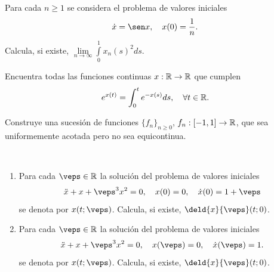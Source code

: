 \documentclass[12pt]{article}
\begin{document}
    \begin{ejercicio}
        Para cada $n \geq 1$ se considera el problema de valores iniciales
        \[
        \dot{x} = \sen x, \quad x(0) = \frac{1}{n}.
        \]
        Calcula, si existe, $\lim\limits_{n \to \infty} \int\limits_0^1 x_n(s)^2 ds$.
    \end{ejercicio}

    \begin{ejercicio}
        Encuentra todas las funciones continuas $x : \mathbb{R} \to \mathbb{R}$ que cumplen
        \[
        e^{x(t)} = \int_0^t e^{-x(s)} ds, \quad \forall t \in \mathbb{R}.
        \]
    \end{ejercicio}

    \begin{ejercicio}
        Construye una sucesión de funciones $\{f_n\}_{n \geq 0}$, $f_n : \left[-1, 1\right] \to \mathbb{R}$, que sea uniformemente acotada pero no sea equicontinua.
    \end{ejercicio}

    \begin{ejercicio}~
        \begin{enumerate}[label=\alph*)]
            \item Para cada $\veps \in \bb{R}$ la solución del problema de valores iniciales
            \[
            \ddot{x} + x + \veps^3 x^2 = 0, \quad x(0) = 0, \quad \dot{x}(0) = 1 + \veps
            \]
            se denota por $x(t; \veps)$. Calcula, si existe, $\deld{x}{\veps}(t; 0)$.
            \item Para cada $\veps \in \bb{R}$ la solución del problema de valores iniciales
            \[
            \ddot{x} + x + \veps^3 x^2 = 0, \quad x(\veps) = 0, \quad \dot{x}(\veps) = 1.
            \]
            se denota por $x(t; \veps)$. Calcula, si existe, $\deld{x}{\veps}(t; 0)$.
        \end{enumerate}
    \end{ejercicio}

    \newpage
    \setcounter{ejercicio}{0} %
\end{document}
